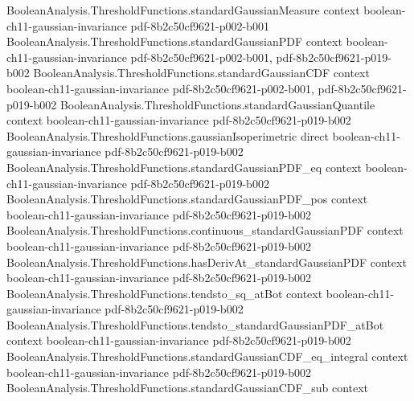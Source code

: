 \begin{lemma}
\leanok
{}
\proofstep
  {BooleanAnalysis.ThresholdFunctions.standardGaussianMeasure}
  {context}
  {boolean-ch11-gaussian-invariance}
  {pdf-8b2c50cf9621-p002-b001}
\proofstep
  {BooleanAnalysis.ThresholdFunctions.standardGaussianPDF}
  {context}
  {boolean-ch11-gaussian-invariance}
  {pdf-8b2c50cf9621-p002-b001,
    pdf-8b2c50cf9621-p019-b002}
\proofstep
  {BooleanAnalysis.ThresholdFunctions.standardGaussianCDF}
  {context}
  {boolean-ch11-gaussian-invariance}
  {pdf-8b2c50cf9621-p002-b001,
    pdf-8b2c50cf9621-p019-b002}
\proofstep
  {BooleanAnalysis.ThresholdFunctions.standardGaussianQuantile}
  {context}
  {boolean-ch11-gaussian-invariance}
  {pdf-8b2c50cf9621-p019-b002}
\proofstep
  {BooleanAnalysis.ThresholdFunctions.gaussianIsoperimetric}
  {direct}
  {boolean-ch11-gaussian-invariance}
  {pdf-8b2c50cf9621-p019-b002}
\proofstep
  {BooleanAnalysis.ThresholdFunctions.standardGaussianPDF_eq}
  {context}
  {boolean-ch11-gaussian-invariance}
  {pdf-8b2c50cf9621-p019-b002}
\proofstep
  {BooleanAnalysis.ThresholdFunctions.standardGaussianPDF_pos}
  {context}
  {boolean-ch11-gaussian-invariance}
  {pdf-8b2c50cf9621-p019-b002}
\proofstep
  {BooleanAnalysis.ThresholdFunctions.continuous_standardGaussianPDF}
  {context}
  {boolean-ch11-gaussian-invariance}
  {pdf-8b2c50cf9621-p019-b002}
\proofstep
  {BooleanAnalysis.ThresholdFunctions.hasDerivAt_standardGaussianPDF}
  {context}
  {boolean-ch11-gaussian-invariance}
  {pdf-8b2c50cf9621-p019-b002}
\proofstep
  {BooleanAnalysis.ThresholdFunctions.tendsto_sq_atBot}
  {context}
  {boolean-ch11-gaussian-invariance}
  {pdf-8b2c50cf9621-p019-b002}
\proofstep
  {BooleanAnalysis.ThresholdFunctions.tendsto_standardGaussianPDF_atBot}
  {context}
  {boolean-ch11-gaussian-invariance}
  {pdf-8b2c50cf9621-p019-b002}
\proofstep
  {BooleanAnalysis.ThresholdFunctions.standardGaussianCDF_eq_integral}
  {context}
  {boolean-ch11-gaussian-invariance}
  {pdf-8b2c50cf9621-p019-b002}
\proofstep
  {BooleanAnalysis.ThresholdFunctions.standardGaussianCDF_sub}
  {context}

\end{lemma}

